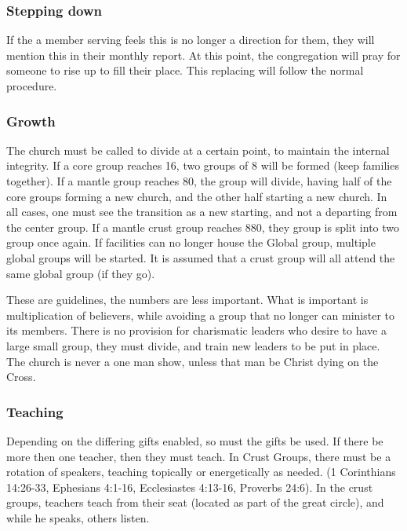 \documentclass[CSHFoundation.tex]{subfiles}
\begin{document}
\subsubsection{Stepping down}

If the a member serving feels this is no longer a direction for them, they will mention this in their monthly report. At this point, the congregation will pray for someone to rise up to fill their place. This replacing will follow the normal procedure.



\subsubsection{Growth}

The church must be called to divide at a certain point, to maintain the internal integrity. If a core group reaches 16, two groups of 8 will be formed (keep families together). If a mantle group reaches 80, the group will divide, having half of the core groups forming a new church, and the other half starting a new church. In all cases, one must see the transition as a new starting, and not a departing from the center group. If a mantle crust group reaches 880, they group is split into two group once again. If facilities can no longer house the Global group, multiple global groups will be started. It is assumed that a crust group will all attend the same global group (if they go).



These are guidelines, the numbers are less important. What is important is multiplication of believers, while avoiding a group that no longer can minister to its members. There is no provision for charismatic leaders who desire to have a large small group, they must divide, and train new leaders to be put in place. The church is never a one man show, unless that man be Christ dying on the Cross.



\subsubsection{Teaching}

Depending on the differing gifts enabled, so must the gifts be used. If there be more then one teacher, then they must teach. In Crust Groups, there must be a rotation of speakers, teaching topically or energetically as needed. (1 Corinthians 14:26-33, Ephesians 4:1-16, Ecclesiastes 4:13-16, Proverbs 24:6). In the crust groups, teachers teach from their seat (located as part of the great circle), and while he speaks, others listen.
\end{document}
